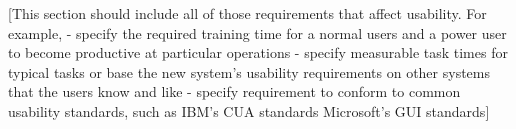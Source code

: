 [This section should include all of those requirements
 that affect usability. For example,
- specify the required training time for a normal
  users and a power user to become productive at
  particular operations
- specify measurable task times for typical tasks
  or base the new system’s usability requirements
  on other systems that the users know and like
- specify requirement to conform to common usability
  standards, such as IBM’s CUA standards Microsoft’s 
  GUI standards]